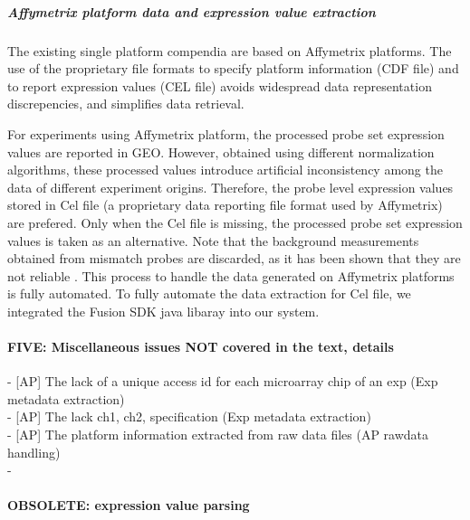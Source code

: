 \subparagraph{Affymetrix platform data and expression value extraction}



The existing single platform compendia are based on Affymetrix
platforms. The use of the proprietary file formats to specify platform
information (CDF file) and to report expression values (CEL file)
avoids widespread data representation discrepencies, and simplifies
data retrieval.


For experiments using Affymetrix platform, the processed probe set expression
values are reported in GEO.
%
However, obtained using different normalization algorithms, these processed
values introduce artificial inconsistency among the data of different
experiment origins.
%
Therefore, the probe level expression values stored in Cel file (a proprietary
data reporting file format used by Affymetrix) are prefered.
%
Only when the Cel file is missing, the processed probe set expression values is
taken as an alternative.
%
Note that the background measurements obtained from mismatch probes are
discarded, as it has been shown that they are not reliable \cite{...}.
%
This process to handle the data generated on Affymetrix platforms is fully
automated.
%
To fully automate the data extraction for Cel file, we integrated the Fusion
SDK java libaray into our system.
%


\paragraph{FIVE: Miscellaneous issues NOT covered in the text, details}

- [AP] The lack of a unique access id for each microarray chip of an exp (Exp metadata extraction) \\
- [AP] The lack ch1, ch2, specification (Exp metadata extraction) \\
- [AP] The platform information extracted from raw data files (AP rawdata handling) \\
- 







\paragraph{OBSOLETE: expression value parsing}

